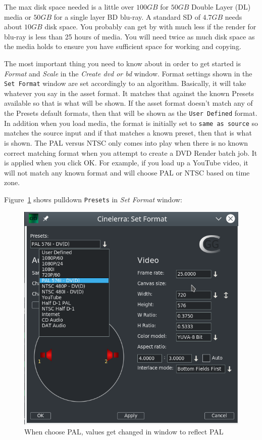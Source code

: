 The max disk space needed is a little over $100GB$ for $50GB$ Double Layer (DL) media or $50GB$ for a single layer BD blu-ray.  A standard SD of $4.7GB$ needs about $10GB$ disk space. You probably can get by with much less if the render for blu-ray is less than 25 hours of media.  You will need twice as much disk space as the media holds to ensure you have sufficient space for working and copying.

The most important thing you need to know about in order to get started is \textit{Format} and \textit{Scale}  in the \textit{Create dvd or bd} window.  Format settings shown in the \texttt{Set Format} window are set accordingly to an algorithm.  Basically, it will take whatever you say in the asset format.  It matches that against the known Presets available so that is what will be shown.  If the asset format doesn't match any of the Presets default formats, then that will be shown as the \texttt{User Defined} format.  In addition when you load media, the format is initially set to \texttt{same as source} so matches the source input and if that matches a known preset, then that is what is shown.  The PAL versus NTSC only comes into play when there is no known correct matching format when you attempt to create a DVD Render batch job.  It is applied when you click OK. For example, if you load up a YouTube video, it will not match any known format and will choose PAL or NTSC based on time zone.

Figure~\ref{fig:preset01} shows pulldown \texttt{Presets} in \textit{Set Format} window:

\begin{figure}[htpb]
    \centering
    \includegraphics[width=0.7\linewidth]{images/preset01.png}
    \caption{When choose PAL, values get changed in window to reflect PAL}
    \label{fig:preset01}
\end{figure}

